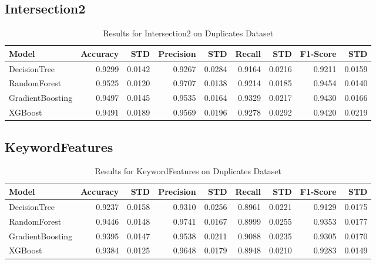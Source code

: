 \documentclass{article}
\begin{document}
\subsection{Intersection2}
\begin{table}[h!]
\centering
\caption{Results for Intersection2 on Duplicates Dataset}
\begin{tabular}{l|rr|rr|rr|rr}
\hline
Model & Accuracy & STD & Precision & STD & Recall & STD & F1-Score & STD \\
\hline
DecisionTree & 0.9299 & 0.0142 & 0.9267 & 0.0284 & 0.9164 & 0.0216 & 0.9211 & 0.0159 \\
RandomForest & 0.9525 & 0.0120 & 0.9707 & 0.0138 & 0.9214 & 0.0185 & 0.9454 & 0.0140 \\
GradientBoosting & 0.9497 & 0.0145 & 0.9535 & 0.0164 & 0.9329 & 0.0217 & 0.9430 & 0.0166 \\
XGBoost & 0.9491 & 0.0189 & 0.9569 & 0.0196 & 0.9278 & 0.0292 & 0.9420 & 0.0219 \\
\hline
\end{tabular}
\end{table}

\subsection{KeywordFeatures}
\begin{table}[h!]
\centering
\caption{Results for KeywordFeatures on Duplicates Dataset}
\begin{tabular}{l|rr|rr|rr|rr}
\hline
Model & Accuracy & STD & Precision & STD & Recall & STD & F1-Score & STD \\
\hline
DecisionTree & 0.9237 & 0.0158 & 0.9310 & 0.0256 & 0.8961 & 0.0221 & 0.9129 & 0.0175 \\
RandomForest & 0.9446 & 0.0148 & 0.9741 & 0.0167 & 0.8999 & 0.0255 & 0.9353 & 0.0177 \\
GradientBoosting & 0.9395 & 0.0147 & 0.9538 & 0.0211 & 0.9088 & 0.0235 & 0.9305 & 0.0170 \\
XGBoost & 0.9384 & 0.0125 & 0.9648 & 0.0179 & 0.8948 & 0.0210 & 0.9283 & 0.0149 \\
\hline
\end{tabular}
\end{table}
\end{document}

